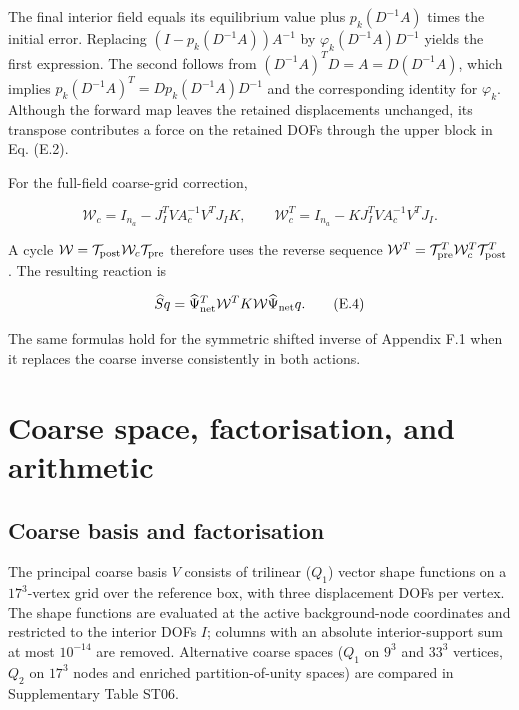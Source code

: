 \documentclass[preprint,12pt,authoryear]{elsarticle}
\begin{document}
The final interior field equals its equilibrium value plus \(p_k(D^{-1}A)\) times the initial error. Replacing \((I-p_k(D^{-1}A))A^{-1}\) by \(\varphi_k(D^{-1}A)D^{-1}\) yields the first expression. The second follows from \((D^{-1}A)^TD=A=D(D^{-1}A)\), which implies \(p_k(D^{-1}A)^T=Dp_k(D^{-1}A)D^{-1}\) and the corresponding identity for \(\varphi_k\). Although the forward map leaves the retained displacements unchanged, its transpose contributes a force on the retained DOFs through the upper block in Eq. (E.2).

For the full-field coarse-grid correction,

\[
\mathcal W_c=I_{n_a}-J_I^TVA_c^{-1}V^TJ_IK,
\qquad
\mathcal W_c^T=I_{n_a}-KJ_I^TVA_c^{-1}V^TJ_I.
\tag{E.3}
\]

A cycle \(\mathcal W=\mathcal T_{\rm post}\mathcal W_c\mathcal T_{\rm pre}\) therefore uses the reverse sequence \(\mathcal W^T=\mathcal T_{\rm pre}^T\mathcal W_c^T\mathcal T_{\rm post}^T\). The resulting reaction is

\[
\widehat S q=\widehat\Psi_{\rm net}^T\mathcal W^TK\mathcal W\widehat\Psi_{\rm net} q.
\tag{E.4}
\]

The same formulas hold for the symmetric shifted inverse of Appendix F.1 when it replaces the coarse inverse consistently in both actions.

\section{Coarse space, factorisation, and arithmetic}

\subsection{Coarse basis and factorisation}

The principal coarse basis \(V\) consists of trilinear (\(Q_1\)) vector shape functions on a \(17^3\)-vertex grid over the reference box, with three displacement DOFs per vertex. The shape functions are evaluated at the active background-node coordinates and restricted to the interior DOFs \(I\); columns with an absolute interior-support sum at most \(10^{-14}\) are removed. Alternative coarse spaces (\(Q_1\) on \(9^3\) and \(33^3\) vertices, \(Q_2\) on \(17^3\) nodes and enriched partition-of-unity spaces) are compared in Supplementary Table ST06.
\end{document}
